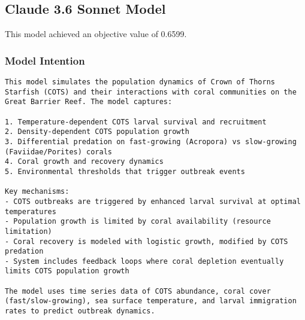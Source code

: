 \subsection{Claude 3.6 Sonnet Model}
This model achieved an objective value of 0.6599.

\subsubsection{Model Intention}
\begin{lstlisting}
This model simulates the population dynamics of Crown of Thorns Starfish (COTS) and their interactions with coral communities on the Great Barrier Reef. The model captures:

1. Temperature-dependent COTS larval survival and recruitment
2. Density-dependent COTS population growth
3. Differential predation on fast-growing (Acropora) vs slow-growing (Faviidae/Porites) corals
4. Coral growth and recovery dynamics
5. Environmental thresholds that trigger outbreak events

Key mechanisms:
- COTS outbreaks are triggered by enhanced larval survival at optimal temperatures
- Population growth is limited by coral availability (resource limitation)
- Coral recovery is modeled with logistic growth, modified by COTS predation
- System includes feedback loops where coral depletion eventually limits COTS population growth

The model uses time series data of COTS abundance, coral cover (fast/slow-growing), sea surface temperature, and larval immigration rates to predict outbreak dynamics.
\end{lstlisting}

